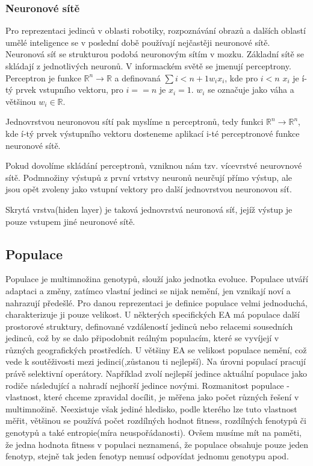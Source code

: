 \subsubsection{Neuronové sítě} Pro reprezentaci jedinců v oblasti robotiky, rozpoznávání obrazů a dalších oblastí umělé inteligence se v poslední době používají nejčastěji neuronové sítě. Neuronová síť se strukturou podobá neuronovým sítím v mozku. Základní sítě se skládají z jednotlivých neuronů. V informackém světě se jmenují perceptrony. Perceptron je funkce $\mathbb{R}^n \rightarrow \mathbb{R}$ a definovaná $\sum{i < n+1} w_{i} x_{i}$, kde pro $i < n$ $x_{i}$ je í-tý prvek vstupního vektoru, pro  $i == n$ je $x_{i}=1$. $w_{i}$ se označuje jako váha a většinou $w_{i} \in \mathbb{R}$. \par
Jednovrstvou neuronovou sítí pak myslíme n perceptronů, tedy funkci $\mathbb{R}^{n} \rightarrow \mathbb{R}^{n}$, kde í-tý prvek výstupního vektoru dosteneme aplikací i-té perceptronové funkce neuronové sítě. \par 
Pokud dovolíme skládání perceptronů, vzniknou nám tzv. vícevrstvé neurovnové sítě. Podmnožiny výstupů z první vrtstvy neuronů neurčují přímo výstup, ale jsou opět zvoleny jako vstupní vektory pro další jednovrstvou neuronovou síť. \par
Skrytá vrstva(hiden layer) je taková jednovrstvá neuronová síť, jejíž výstup je pouze vstupem jiné neuronové sítě. \par
\subsection{Populace}
Populace je multimnožina genotypů, slouží jako jednotka evoluce. Populace utváří adaptaci a změny, zatímco vlastní jedinci se nijak nemění, jen vznikají noví a nahrazují předešlé. Pro danou reprezentaci je definice populace velmi jednoduchá, charakterizuje ji pouze velikost. U některých specifických EA má populace další prostorové struktury, definované vzdáleností jedinců nebo relacemi sousedních jedinců, což by se dalo připodobnit reálným populacím, které se vyvíjejí v různých geografických prostředích. U většiny EA se velikost populace nemění, což vede k soutěživosti mezi jedinci(,zůstanou ti nejlepší). Na úrovni populací pracují právě selektivní operátory. Například zvolí nejlepší jedince aktuální populace jako rodiče následující a nahradí nejhorší jedince novými. Rozmanitost populace - vlastnost, které chceme zpravidal docílit, je měřena jako počet různých řešení v multimnožině. Neexistuje však jediné hledisko, podle kterého lze tuto vlastnost měřit, většinou se používá počet rozdílných hodnot fitness, rozdílných fenotypů či genotypů a také entropie(míra neuspořádanosti). Ovšem musíme mít na paměti, že jedna hodnota fitness v populaci neznamená, že populace obsahuje pouze jeden fenotyp, stejně tak jeden fenotyp nemusí odpovídat jednomu genotypu apod. 
